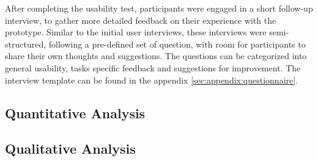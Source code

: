 After completing the usability test, participants were engaged in a short follow-up interview, to gather more detailed feedback on their experience with the prototype. 
Similar to the initial user interviews, these interviews were semi-structured, following a pre-defined set of question, with room for participants to share their own thoughts and suggestions.
The questions can be categorized into general usability, tasks specific feedback and suggestions for improvement.
The interview template can be found in the appendix \ref{sec:appendix:questionnaire}.


\subsection{Quantitative Analysis}
\label{sec:methodology:study:quantitative}

\subsection{Qualitative Analysis}
\label{sec:methodology:study:qualitative}

